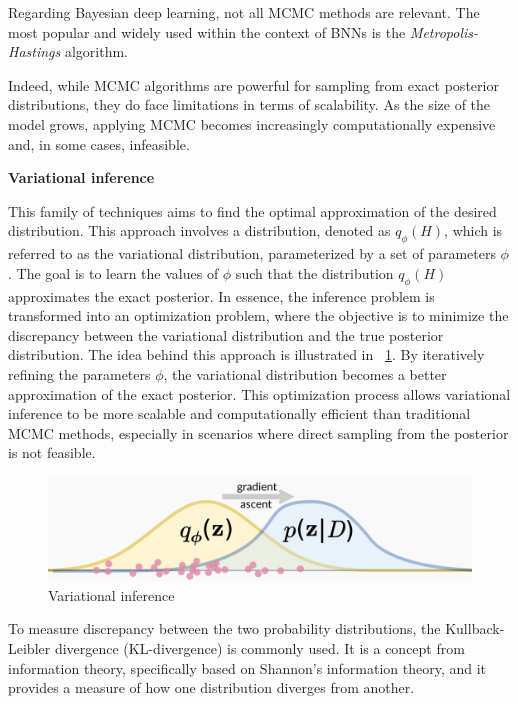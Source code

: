 Regarding Bayesian deep learning, not all MCMC methods are relevant. The most popular and widely used within the context of BNNs is the \textit{Metropolis-Hastings} algorithm.

Indeed, while MCMC algorithms are powerful for sampling from exact posterior distributions, they do face limitations in terms of scalability. As the size of the model grows, applying MCMC becomes increasingly computationally expensive and, in some cases, infeasible.

\vspace{0.2cm}
\textbf{Variational inference}

This family of techniques aims to find the optimal approximation of the desired distribution. This approach involves a distribution, denoted as $q_{\phi}(H)$, which is referred to as the variational distribution, parameterized by a set of parameters $\phi$. The goal is to learn the values of $\phi$ such that the distribution $q_{\phi}(H)$ approximates the exact posterior. In essence, the inference problem is transformed into an optimization problem, where the objective is to minimize the discrepancy between the variational distribution and the true posterior distribution. The idea behind this approach is illustrated in \Fig~\ref{fig:vi}. By iteratively refining the parameters $\phi$, the variational distribution becomes a better approximation of the exact posterior. This optimization process allows variational inference to be more scalable and computationally efficient than traditional MCMC methods, especially in scenarios where direct sampling from the posterior is not feasible.

\begin{figure}[h]
	\centering
	\includegraphics[width=0.8\linewidth]{ImageFiles/BayesianNeuralNetworks/vi}
	\caption{Variational inference \cite{VBPI}}
	\label{fig:vi}
\end{figure}

To measure discrepancy  between the two probability distributions, the Kullback-Leibler divergence (KL-divergence) is commonly used.  It is a concept from information theory, specifically based on Shannon's information theory, and it provides a measure of how one distribution diverges from another.

